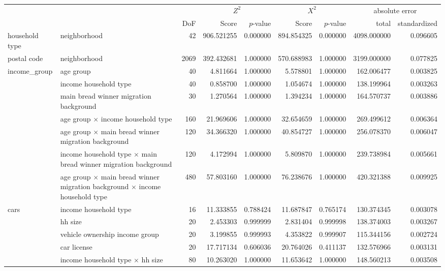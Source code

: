 \begin{tabular}{ll|r|rr|rr|rr}
\toprule
 &  &  & \multicolumn{2}{|c}{$Z^2$} & \multicolumn{2}{|c}{$X^2$} & \multicolumn{2}{|c}{absolute error} \\
 &  & DoF & Score & $p$-value & Score & $p$-value & total & standardized \\
\midrule
household type & neighborhood & 42 & 906.521255 & 0.000000 & 894.854325 & 0.000000 & 4098.000000 & 0.096605 \\
\cline{1-9}
postal code & neighborhood & 2069 & 392.432681 & 1.000000 & 570.688983 & 1.000000 & 3199.000000 & 0.077825 \\
\cline{1-9}
\multirow[t]{7}{*}{income_group} & age group & 40 & 4.811664 & 1.000000 & 5.578801 & 1.000000 & 162.006477 & 0.003825 \\
 & income household type & 40 & 0.858700 & 1.000000 & 1.054674 & 1.000000 & 138.199964 & 0.003263 \\
 & main bread winner migration background & 30 & 1.270564 & 1.000000 & 1.394234 & 1.000000 & 164.570737 & 0.003886 \\
 & age group $\times$ income household type & 160 & 21.969606 & 1.000000 & 32.654659 & 1.000000 & 269.499612 & 0.006364 \\
 & age group $\times$ main bread winner migration background & 120 & 34.366320 & 1.000000 & 40.854727 & 1.000000 & 256.078370 & 0.006047 \\
 & income household type $\times$ main bread winner migration background & 120 & 4.172994 & 1.000000 & 5.809870 & 1.000000 & 239.738984 & 0.005661 \\
 & age group $\times$ main bread winner migration background $\times$ income household type & 480 & 57.803160 & 1.000000 & 76.238676 & 1.000000 & 420.321388 & 0.009925 \\
\cline{1-9}
\multirow[t]{15}{*}{cars} & income household type & 16 & 11.333855 & 0.788424 & 11.687847 & 0.765174 & 130.374345 & 0.003078 \\
 & hh size & 20 & 2.453303 & 0.999999 & 2.831404 & 0.999998 & 138.374003 & 0.003267 \\
 & vehicle ownership income group & 20 & 3.199855 & 0.999993 & 4.353822 & 0.999907 & 115.344156 & 0.002724 \\
 & car license & 20 & 17.717134 & 0.606036 & 20.764026 & 0.411137 & 132.576966 & 0.003131 \\
 & income household type $\times$ hh size & 80 & 10.263020 & 1.000000 & 11.653642 & 1.000000 & 148.560213 & 0.003508 \\

\end{tabular}
